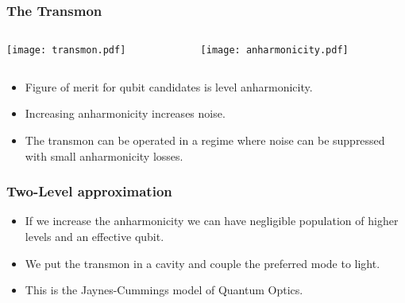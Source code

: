 \documentclass{beamer}
\begin{document}
\begin{frame}
    \frametitle{The Transmon}

    \begin{columns}[T]
        \begin{column}{0.35\linewidth}
    \texttt{[image: transmon.pdf]}
        \end{column}
        \begin{column}{0.5\linewidth}
    \texttt{[image: anharmonicity.pdf]}
        \end{column}
    \end{columns}

        \begin{itemize}

            \item Figure of merit for qubit candidates is level 
                    anharmonicity. 
            \item Increasing anharmonicity increases noise.
            \item The transmon can be operated in a regime where noise 
                    can be suppressed with small anharmonicity losses. 
                    
        \end{itemize}

\end{frame}
\begin{frame}

    \frametitle{Two-Level approximation}

    \begin{itemize}
        \item If we increase the anharmonicity we can have negligible 
                population of higher levels and an effective qubit.
        \item We put the transmon in a cavity and couple 
                the preferred mode to light.
        \item This is the Jaynes-Cummings model of Quantum Optics. 
    \end{itemize}

\end{frame}
\end{document}
